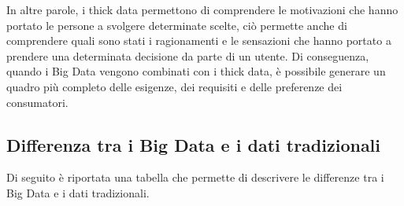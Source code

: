 In altre parole, i thick data permettono di comprendere le motivazioni che hanno portato le persone a svolgere determinate scelte, ciò permette anche di comprendere quali sono stati i ragionamenti e le sensazioni che hanno portato a prendere una determinata decisione da parte di un utente. Di conseguenza, quando i Big Data vengono combinati con i thick data, è possibile generare un quadro più completo delle esigenze, dei requisiti e delle preferenze dei consumatori.

\subsection{Differenza tra i Big Data e i dati tradizionali}

Di seguito è riportata una tabella che permette di descrivere le differenze tra i Big Data e i dati tradizionali.\cite{big_vs_traditional_data}

